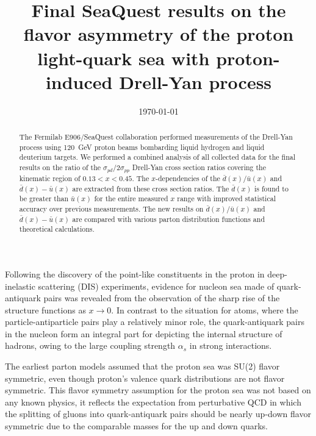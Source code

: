 \documentclass[reprint,aps,unsortedaddress,superscriptaddress,prl,floatfix,showpacs,linenumbers,final]{revtex4-2}
\begin{document}
\title{Final SeaQuest results on the flavor asymmetry of the proton light-quark sea with proton-induced Drell-Yan process}


\date{\today}

\begin{abstract}
	The Fermilab E906/SeaQuest collaboration performed measurements of the Drell-Yan process using
	\SI{120}{\GeV} proton beams bombarding liquid hydrogen and liquid deuterium targets.
	We performed a combined analysis of all collected data for the final results on the ratio of the $\sigma_{pd}/2\sigma_{pp}$ Drell-Yan cross
	section ratios covering the kinematic region of $0.13 < x < 0.45$.
	The $x$-dependencies of the $\bar{d}\left(x\right) / \bar{u}\left(x\right)$ and $\bar{d}\left(x\right) - \bar{u}\left(x\right)$
	are extracted from these cross section ratios.
	The $\bar{d}\left(x\right)$ is found to be greater than $\bar{u}\left(x\right)$ for the entire measured $x$
	range with improved statistical accuracy over previous measurements.
	The new results on $\bar{d}\left(x\right) / \bar{u}\left(x\right)$ and $\bar{d}\left(x\right) - \bar{u}\left(x\right)$
	are compared with various parton distribution functions and theoretical calculations.
\end{abstract}


\maketitle


Following the discovery of the point-like constituents in the proton in
deep-inelastic scattering (DIS) experiments, evidence for nucleon sea
made of quark-antiquark pairs
was revealed from the observation of the sharp rise of the structure
functions as $x \to 0$. In contrast to the situation for atoms, where
the particle-antiparticle pairs play a relatively minor role, the
quark-antiquark pairs in the nucleon form an integral part for
depicting the internal structure of hadrons, owing to the large
coupling strength $\alpha_s$ in strong interactions.

The earliest parton models assumed that the proton sea was SU(2)
flavor symmetric, even though proton's valence quark
distributions are not flavor symmetric. This flavor symmetry assumption
for the proton sea was not based on any known physics, it reflects the
expectation from perturbative QCD in which the splitting of gluons
into quark-antiquark pairs should be nearly up-down flavor symmetric
due to the comparable masses for the up and down quarks.
\end{document}
